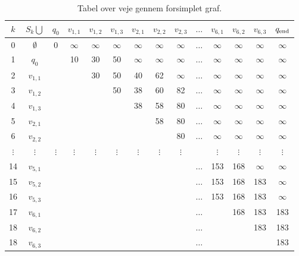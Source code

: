 \begin{table}[H]
\centering
\begin{tabular}{|c|c|c|c|c|c|c|c|c|c|c|c|c|c|} 
\hline
$k$ & $S_{k} \bigcup$ & $q_{0}$ & $v_{1,1}$ & $v_{1,2}$ & $v_{1,3}$ & $v_{2,1}$ & $v_{2,2}$ & $v_{2,3}$ & $\ldots$ & $v_{6,1}$ & $v_{6,2}$ & $v_{6,3}$ & $q_{\textrm{end}}$ \\
\hline
0 & $\emptyset$ & 0 & $\infty$ & $\infty$ & $\infty$ & $\infty$ & $\infty$ & $\infty$ & $\ldots$ & $\infty$ & $\infty$ & $\infty$ & $\infty$ \\ 
1 & $q_{0}$ & & 10 & 30 & 50 & $\infty$ & $\infty$ & $\infty$ & $\ldots$ & $\infty$ & $\infty$ & $\infty$ & $\infty$\\ 
2 & $v_{1,1}$ & & & 30 & 50 & 40 & 62 & $\infty$ & $\ldots$ & $\infty$ & $\infty$ & $\infty$ & $\infty$\\ 
3 & $v_{1,2}$ & & & & 50 & 38 & 60 & 82 & $\ldots$ & $\infty$ & $\infty$ & $\infty$ & $\infty$\\
4 & $v_{1,3}$ & & & & & 38 & 58 & 80 & $\ldots$ & $\infty$ & $\infty$ & $\infty$ & $\infty$\\ 
5 & $v_{2,1}$ & & & & & & 58 & 80 & $\ldots$ & $\infty$ & $\infty$ & $\infty$ & $\infty$\\ 
6 & $v_{2,2}$ & & & & & & & 80 & $\ldots$ & $\infty$ & $\infty$ & $\infty$ & $\infty$\\  
$\vdots$ & $\vdots$ & $\vdots$ & $\vdots$ & $\vdots$ & $\vdots$ & $\vdots$ & $\vdots$ & $\vdots$ &  & $\vdots$ & $\vdots$ & $\vdots$ & $\vdots$\\ 
14 & $v_{5,1}$ &  &  &  &  &  &  &  & $\ldots$ & 153 & 168 & $\infty$ & $\infty$\\ 
15 & $v_{5,2}$ &  &  &  &  &  &  &  & $\ldots$ & 153 & 168 & 183 & $\infty$\\ 
16 & $v_{5,3}$ &  &  &  &  &  &  &  & $\ldots$ & 153 & 168 & 183 & $\infty$\\ 
17 & $v_{6,1}$ &  &  &  &  &  &  &  & $\ldots$ &  & 168 & 183 & 183\\ 
18 & $v_{6,2}$ &  &  &  &  &  &  &  & $\ldots$ &  &  & 183 & 183\\ 
18 & $v_{6,3}$ &  &  &  &  &  &  &  & $\ldots$ &  &  &  & 183\\ 
\hline
\end{tabular}
\caption{Tabel over veje gennem forsimplet graf.}
\label{table:forsimplet_graf}
\end{table}